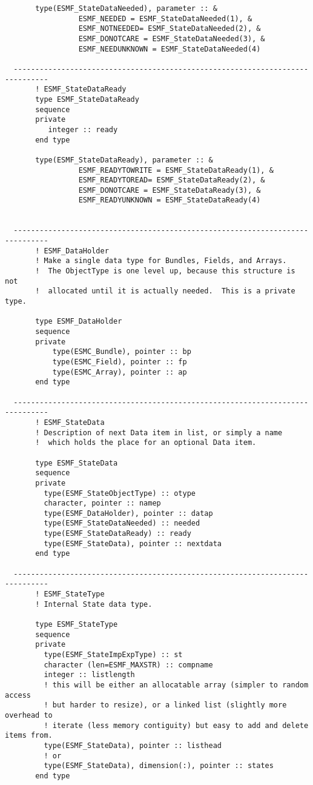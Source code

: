 \begin{verbatim}
       type(ESMF_StateDataNeeded), parameter :: &
                 ESMF_NEEDED = ESMF_StateDataNeeded(1), &
                 ESMF_NOTNEEDED= ESMF_StateDataNeeded(2), &
                 ESMF_DONOTCARE = ESMF_StateDataNeeded(3), &
                 ESMF_NEEDUNKNOWN = ESMF_StateDataNeeded(4)
 
  ------------------------------------------------------------------------------
       ! ESMF_StateDataReady
       type ESMF_StateDataReady
       sequence
       private
          integer :: ready
       end type
 
       type(ESMF_StateDataReady), parameter :: &
                 ESMF_READYTOWRITE = ESMF_StateDataReady(1), &
                 ESMF_READYTOREAD= ESMF_StateDataReady(2), &
                 ESMF_DONOTCARE = ESMF_StateDataReady(3), &
                 ESMF_READYUNKNOWN = ESMF_StateDataReady(4)
 
 
  ------------------------------------------------------------------------------
       ! ESMF_DataHolder
       ! Make a single data type for Bundles, Fields, and Arrays.
       !  The ObjectType is one level up, because this structure is not
       !  allocated until it is actually needed.  This is a private type.
 
       type ESMF_DataHolder
       sequence
       private
           type(ESMC_Bundle), pointer :: bp
           type(ESMC_Field), pointer :: fp 
           type(ESMC_Array), pointer :: ap
       end type
 
  ------------------------------------------------------------------------------
       ! ESMF_StateData
       ! Description of next Data item in list, or simply a name
       !  which holds the place for an optional Data item.
 
       type ESMF_StateData
       sequence
       private
         type(ESMF_StateObjectType) :: otype
         character, pointer :: namep
         type(ESMF_DataHolder), pointer :: datap
         type(ESMF_StateDataNeeded) :: needed
         type(ESMF_StateDataReady) :: ready
         type(ESMF_StateData), pointer :: nextdata
       end type
 
  ------------------------------------------------------------------------------
       ! ESMF_StateType
       ! Internal State data type.
 
       type ESMF_StateType
       sequence
       private
         type(ESMF_StateImpExpType) :: st
         character (len=ESMF_MAXSTR) :: compname
         integer :: listlength
         ! this will be either an allocatable array (simpler to random access
         ! but harder to resize), or a linked list (slightly more overhead to
         ! iterate (less memory contiguity) but easy to add and delete items from.
         type(ESMF_StateData), pointer :: listhead
         ! or
         type(ESMF_StateData), dimension(:), pointer :: states
       end type
 

\end{verbatim}
